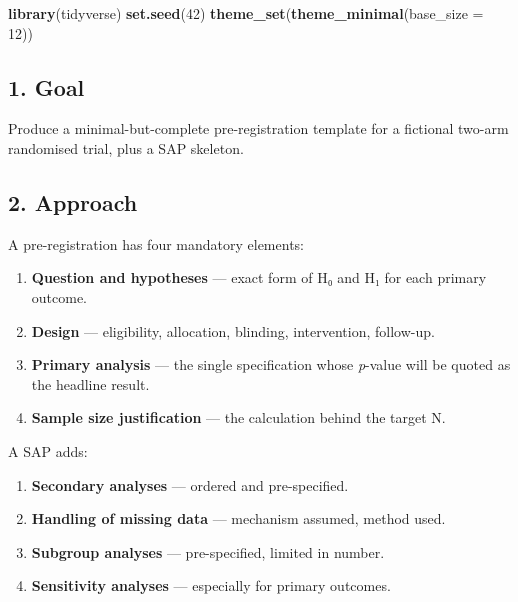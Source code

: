 \documentclass[
]{article}
\newenvironment{Shaded}{\begin{snugshade}}{\end{snugshade}}
\newcommand{\AttributeTok}[1]{\textcolor[rgb]{0.13,0.29,0.53}{#1}}
\newcommand{\DecValTok}[1]{\textcolor[rgb]{0.00,0.00,0.81}{#1}}
\newcommand{\FunctionTok}[1]{\textcolor[rgb]{0.13,0.29,0.53}{\textbf{#1}}}
\newcommand{\NormalTok}[1]{#1}
\providecommand{\tightlist}{%
  \setlength{\itemsep}{0pt}\setlength{\parskip}{0pt}}
\begin{document}
\begin{Shaded}
\begin{Highlighting}[]
\FunctionTok{library}\NormalTok{(tidyverse)}
\FunctionTok{set.seed}\NormalTok{(}\DecValTok{42}\NormalTok{)}
\FunctionTok{theme\_set}\NormalTok{(}\FunctionTok{theme\_minimal}\NormalTok{(}\AttributeTok{base\_size =} \DecValTok{12}\NormalTok{))}
\end{Highlighting}
\end{Shaded}

\subsection{1. Goal}\label{goal}

Produce a minimal-but-complete pre-registration template for a fictional
two-arm randomised trial, plus a SAP skeleton.

\subsection{2. Approach}\label{approach}

A pre-registration has four mandatory elements:

\begin{enumerate}
\def\labelenumi{\arabic{enumi}.}
\tightlist
\item
  \textbf{Question and hypotheses} --- exact form of H₀ and H₁ for each
  primary outcome.
\item
  \textbf{Design} --- eligibility, allocation, blinding, intervention,
  follow-up.
\item
  \textbf{Primary analysis} --- the single specification whose
  \emph{p}-value will be quoted as the headline result.
\item
  \textbf{Sample size justification} --- the calculation behind the
  target N.
\end{enumerate}

A SAP adds:

\begin{enumerate}
\def\labelenumi{\arabic{enumi}.}
\setcounter{enumi}{4}
\tightlist
\item
  \textbf{Secondary analyses} --- ordered and pre-specified.
\item
  \textbf{Handling of missing data} --- mechanism assumed, method used.
\item
  \textbf{Subgroup analyses} --- pre-specified, limited in number.
\item
  \textbf{Sensitivity analyses} --- especially for primary outcomes.
\end{enumerate}
\end{document}
